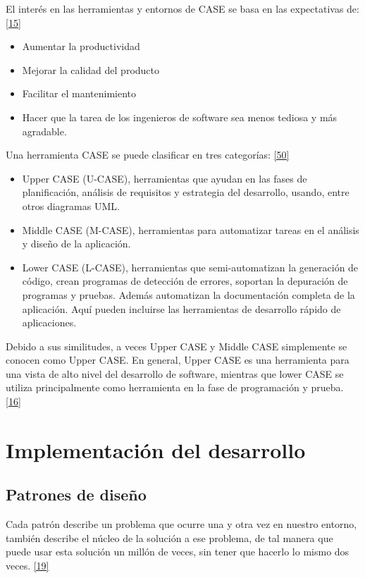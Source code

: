 El interés en las herramientas y entornos de CASE se basa en las expectativas de: \hyperlink{b15}{[15]}
\begin{itemize}
	\item Aumentar la productividad
	\item Mejorar la calidad del producto
	\item Facilitar el mantenimiento
	\item Hacer que la tarea de los ingenieros de software sea menos tediosa y más agradable. 
\end{itemize}

Una herramienta CASE se puede clasificar en tres categorías: \hyperlink{b50}{[50]}

\begin{itemize}
	\item Upper CASE (U-CASE), herramientas que ayudan en las fases de planificación, análisis de requisitos y estrategia del desarrollo, usando, entre otros diagramas UML.
	\item Middle CASE (M-CASE), herramientas para automatizar tareas en el análisis y diseño de la aplicación.
	\item Lower CASE (L-CASE), herramientas que semi-automatizan la generación de código, crean programas de detección de errores, soportan la depuración de programas y pruebas. Además automatizan la documentación completa de la aplicación. Aquí pueden incluirse las herramientas de desarrollo rápido de aplicaciones.
\end{itemize}

Debido a sus similitudes, a veces Upper CASE y Middle CASE simplemente se conocen como Upper CASE. En general, Upper CASE es una herramienta para una vista de alto nivel del desarrollo de software, mientras que lower CASE se utiliza principalmente como herramienta en la fase de programación y prueba. \hyperlink{b16}{[16]}

\newpage

\section {Implementación del desarrollo}

\subsection{Patrones de diseño}

Cada patrón describe un problema que ocurre una y otra vez en nuestro entorno, también describe el núcleo de la solución a ese problema, de tal manera que puede usar esta solución un millón de veces, sin tener que hacerlo lo mismo dos veces. \hyperlink{b19}{[19]} \\

